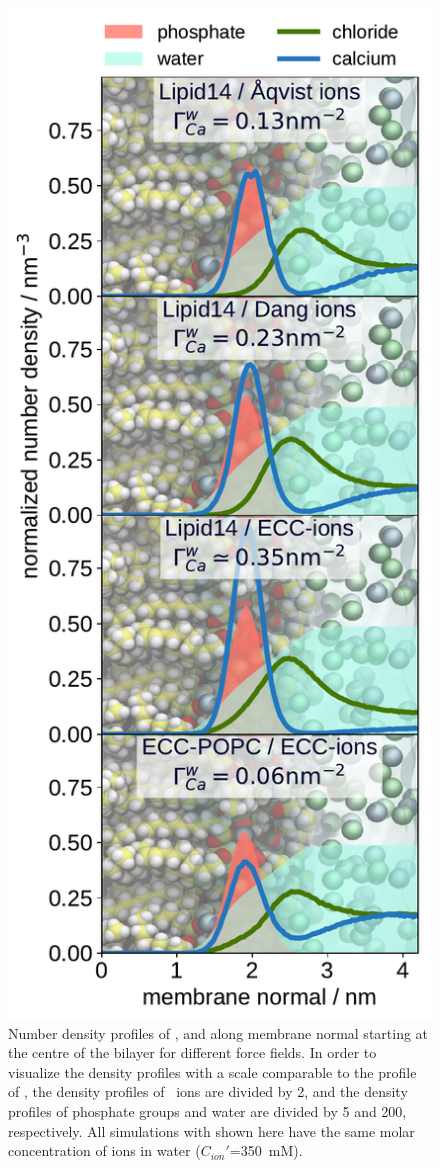 \begin{figure}[htbp!] 
  \centering 
  \includegraphics[width=\figwidth]{../img/ecc_popc/density_profiles_ca_cl_wat_phos_models-compar_1-4.pdf} 
  \caption{\label{fig:cacl-dens} 
    Number density profiles of ,  and  along membrane normal starting at the centre of the bilayer 
    for different force fields. 
    In order to visualize the density profiles with a scale comparable to the profile of ,  
    the density profiles of~ ions are divided by 2, and 
    the density profiles of phosphate groups and water are divided by 5 and 200, respectively.  
    All simulations with  shown here have the same molar concentration of ions in water ($C_{ion}'$=350~mM). 
    } 
\end{figure} 


